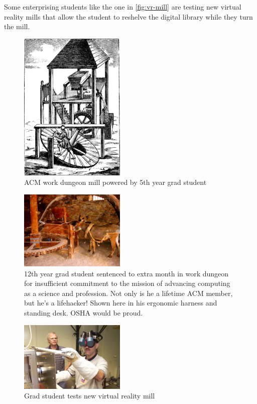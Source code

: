 Some enterprising students like the one in \autoref{fig:vr-mill} are testing
new virtual reality mills that allow the student to reshelve the digital
library while they turn the mill.

\begin{figure}
  \centering
  \includegraphics[width=0.45\textwidth]{figures/mill.png}
  \caption{ACM work dungeon mill powered by 5th year grad student}
  \label{fig:mill}
\end{figure}

\begin{figure}
  \centering
  \includegraphics[width=0.45\textwidth]{figures/horse-mill.jpg}
  \caption{12th year grad student sentenced to extra
  month in work dungeon for insufficient commitment to the mission of advancing
computing as a science and profession.
Not only is he a lifetime ACM member, but he's a lifehacker!  Shown here in his
ergonomic harness and standing desk.
OSHA would be proud.}
  \label{fig:horse-mill}
\end{figure}

\begin{figure}
  \centering
  \includegraphics[width=0.45\textwidth]{figures/future-mill.jpg}
  \caption{Grad student tests new virtual reality mill}
  \label{fig:vr-mill}
\end{figure}

